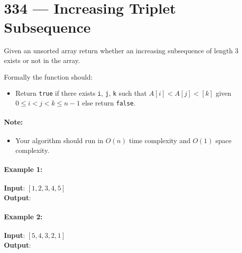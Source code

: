 \section{334 --- Increasing Triplet Subsequence}
Given an unsorted array return whether an increasing subsequence of length 3 exists or not in the array.
\par
Formally the function should:
\begin{itemize}
\item Return \texttt{true} if there exists \texttt{i}, \texttt{j}, \texttt{k} such that $A[i] < A[j] < [k]$ given $0 \leq i < j < k \leq n-1$ else return \texttt{false}.

\end{itemize}

\paragraph{Note:} 
\begin{itemize}
\item Your algorithm should run in $O(n)$ time complexity and $O(1)$ space complexity.
\end{itemize}

\paragraph{Example 1:}

\begin{flushleft}
\textbf{Input}: $[1,2,3,4,5]$
\\
\textbf{Output}: 
\end{flushleft}

\paragraph{Example 2:}

\begin{flushleft}
\textbf{Input}: $[5,4,3,2,1]$
\\
\textbf{Output}: 
\end{flushleft}



